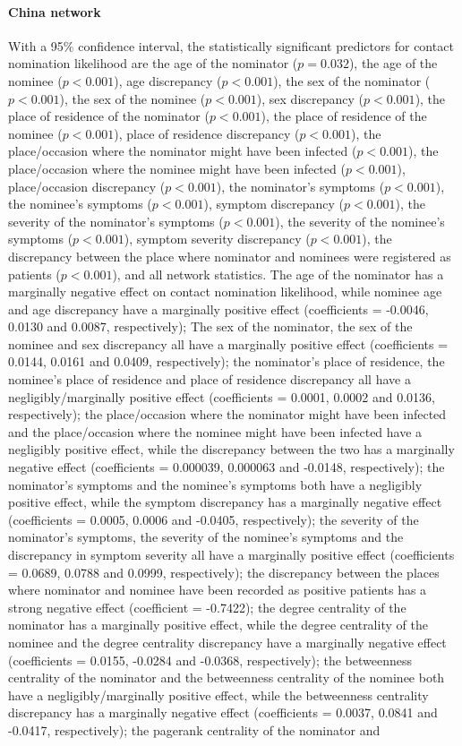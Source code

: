 \paragraph{China network} With a 95\% confidence interval, the statistically significant predictors for contact nomination likelihood are the age of the nominator ($p=0.032$), the age of the nominee ($p<0.001$), age discrepancy ($p<0.001$), the sex of the nominator ($p<0.001$), the sex of the nominee ($p<0.001$), sex discrepancy ($p<0.001$), the place of residence of the nominator ($p<0.001$), the place of residence of the nominee ($p<0.001$), place of residence discrepancy ($p<0.001$), the place/occasion where the nominator might have been infected ($p<0.001$), the place/occasion where the nominee might have been infected ($p<0.001$), place/occasion discrepancy ($p<0.001$), the nominator's symptoms ($p<0.001$), the nominee's symptoms ($p<0.001$), symptom discrepancy ($p<0.001$), the severity of the nominator's symptoms ($p<0.001$), the severity of the nominee's symptoms ($p<0.001$), symptom severity discrepancy ($p<0.001$), the discrepancy between the place where nominator and nominees were registered as patients ($p<0.001$), and all network statistics. The age of the nominator has a marginally negative effect on contact nomination likelihood, while nominee age and age discrepancy have a marginally positive effect (coefficients = -0.0046, 0.0130 and 0.0087, respectively); The sex of the nominator, the sex of the nominee and sex discrepancy all have a marginally positive effect (coefficients = 0.0144, 0.0161 and 0.0409, respectively); the nominator's place of residence, the nominee's place of residence and place of residence discrepancy all have a negligibly/marginally positive effect (coefficients = 0.0001, 0.0002 and 0.0136, respectively); the place/occasion where the nominator might have been infected and the place/occasion where the nominee might have been infected have a negligibly positive effect, while the discrepancy between the two has a marginally negative effect (coefficients = 0.000039, 0.000063 and -0.0148, respectively); the nominator's symptoms and the nominee's symptoms both have a negligibly positive effect, while the symptom discrepancy has a marginally negative effect (coefficients = 0.0005, 0.0006 and -0.0405, respectively); the severity of the nominator's symptoms, the severity of the nominee's symptoms and the discrepancy in symptom severity all have a marginally positive effect (coefficients = 0.0689, 0.0788 and 0.0999, respectively); the discrepancy between the places where nominator and nominee have been recorded as positive patients has a strong negative effect (coefficient = -0.7422); the degree centrality of the nominator has a marginally positive effect, while the degree centrality of the nominee and the degree centrality discrepancy have a marginally negative effect (coefficients = 0.0155, -0.0284 and -0.0368, respectively); the betweenness centrality of the nominator and the betweenness centrality of the nominee both have a negligibly/marginally positive effect, while the betweenness centrality discrepancy has a marginally negative effect (coefficients = 0.0037, 0.0841 and -0.0417, respectively); the pagerank centrality of the nominator and 